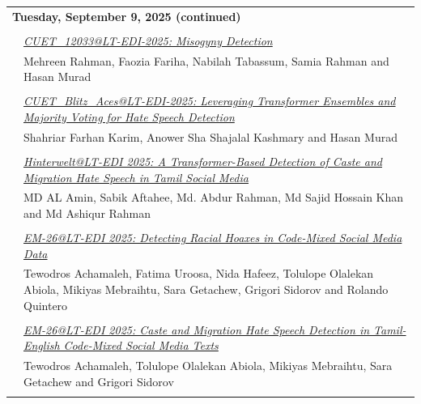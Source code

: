 \documentclass[11pt,oneside]{book}
\begin{document}
    \newpage
          \begin{tabular}{p{24mm}p{124mm}}
    \multicolumn{2}{l}{\bf Tuesday, September 9, 2025 (continued)} \\\\
          
                      & \hyperlink{page.127}{\emph{CUET\_12033@LT-EDI-2025: Misogyny Detection}}\\
        & Mehreen Rahman\index{Rahman}, Faozia Fariha\index{Fariha}, Nabilah Tabassum\index{Tabassum}, Samia Rahman\index{Rahman} and Hasan Murad\index{Murad}\\\\
                
                      & \hyperlink{page.133}{\emph{CUET\_Blitz\_Aces@LT-EDI-2025: Leveraging Transformer Ensembles and Majority Voting for Hate Speech Detection}}\\
        & Shahriar Farhan Karim\index{Karim}, Anower Sha Shajalal Kashmary\index{Kashmary} and Hasan Murad\index{Murad}\\\\
                
                      & \hyperlink{page.140}{\emph{Hinterwelt@LT-EDI 2025: A Transformer-Based Detection of Caste and Migration Hate Speech in Tamil Social Media}}\\
        & MD AL Amin\index{Amin}, Sabik Aftahee\index{Aftahee}, Md. Abdur Rahman\index{Rahman}, Md Sajid Hossain Khan\index{Khan} and Md Ashiqur Rahman\index{Rahman}\\\\
                
                      & \hyperlink{page.146}{\emph{EM-26@LT-EDI 2025: Detecting Racial Hoaxes in Code-Mixed Social Media Data}}\\
        & Tewodros Achamaleh\index{Achamaleh}, Fatima Uroosa\index{Uroosa}, Nida Hafeez\index{Hafeez}, Tolulope Olalekan Abiola\index{Abiola}, Mikiyas Mebraihtu\index{Mebraihtu}, Sara Getachew\index{Getachew}, Grigori Sidorov\index{Sidorov} and Rolando Quintero\index{Quintero}\\\\
                
                      & \hyperlink{page.152}{\emph{EM-26@LT-EDI 2025: Caste and Migration Hate Speech Detection in Tamil-English Code-Mixed Social Media Texts}}\\
        & Tewodros Achamaleh\index{Achamaleh}, Tolulope Olalekan Abiola\index{Abiola}, Mikiyas Mebraihtu\index{Mebraihtu}, Sara Getachew\index{Getachew} and Grigori Sidorov\index{Sidorov}\\\\
                

\end{tabular}
\end{document}
